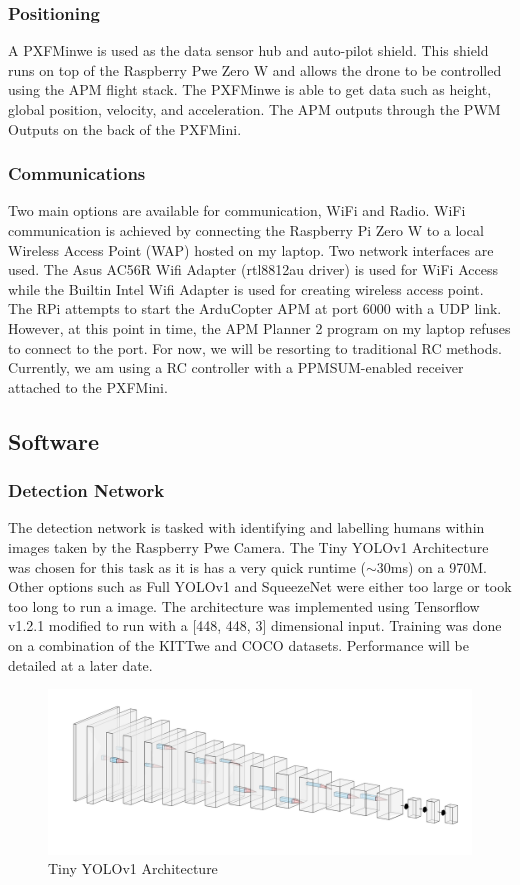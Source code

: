 \documentclass{article}
\begin{document}
\subsubsection{Positioning}
A PXFMinwe is used as the data sensor hub and auto-pilot shield. This shield runs on top of the Raspberry Pwe Zero W and allows the drone to be controlled using the APM flight stack. The PXFMinwe is able to get data such as height, global position, velocity, and acceleration. The APM outputs through the PWM Outputs on the back of the PXFMini.

\subsubsection{Communications}
Two main options are available for communication, WiFi and Radio. WiFi communication is achieved by connecting the Raspberry Pi Zero W to a local Wireless Access Point (WAP) hosted on my laptop. Two network interfaces are used. The Asus AC56R Wifi Adapter (rtl8812au driver) is used for WiFi Access while the Builtin Intel Wifi Adapter is used for creating wireless access point. The RPi attempts to start the ArduCopter APM at port 6000 with a UDP link. However, at this point in time, the APM Planner 2 program on my laptop refuses to connect to the port. For now, we will be resorting to traditional RC methods. Currently, we am using a RC controller with a PPMSUM-enabled receiver attached to the PXFMini.

\subsection{Software}
\subsubsection{Detection Network}
The detection network is tasked with identifying and labelling humans within images taken by the Raspberry Pwe Camera. The Tiny YOLOv1 Architecture was chosen for this task as it is has a very quick runtime ($\sim$30ms) on a 970M. Other options such as Full YOLOv1 and SqueezeNet were either too large or took too long to run a image. The architecture was implemented using Tensorflow v1.2.1 modified to run with a [448, 448, 3] dimensional input. Training was done on a combination of the KITTwe and COCO datasets. Performance will be detailed at a later date.

\begin{figure}[h!]
  \caption{Tiny YOLOv1 Architecture}
  \includegraphics[width=\textwidth]{nn}
\end{figure}
\end{document}
